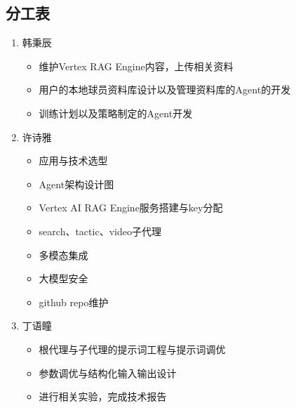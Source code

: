 \documentclass{article}
\theoremstyle{plain}
\theoremstyle{definition}
\theoremstyle{remark}
\begin{document}
\subsection{分工表}
\begin{enumerate}
    \item 韩秉辰
    \begin{itemize}
        \item 维护Vertex RAG Engine内容，上传相关资料
        \item 用户的本地球员资料库设计以及管理资料库的Agent的开发
        \item 训练计划以及策略制定的Agent开发
    \end{itemize}
    \item 许诗雅
    \begin{itemize}
        \item 应用与技术选型
        \item Agent架构设计图
        \item Vertex AI RAG Engine服务搭建与key分配
        \item search、tactic、video子代理
        \item 多模态集成
        \item 大模型安全
        \item github repo维护
    \end{itemize}
    \item 丁语瞳
    \begin{itemize}
        \item 根代理与子代理的提示词工程与提示词调优
        \item 参数调优与结构化输入输出设计
        \item 进行相关实验，完成技术报告
    \end{itemize}
\end{enumerate}
\end{document}
